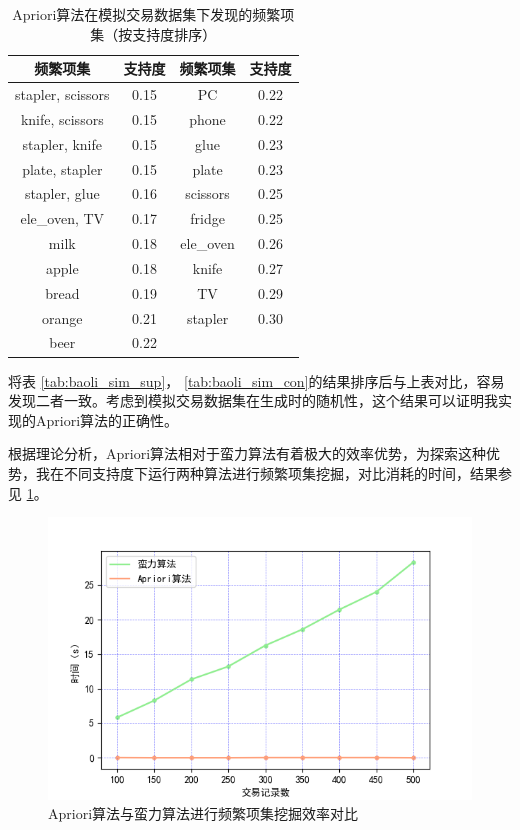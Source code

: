 \documentclass[12pt,a4paper]{article}
\theoremstyle{definition}
\begin{document}
\begin{table}[H]
	\renewcommand\arraystretch{1.35}
	\caption{Apriori算法在模拟交易数据集下发现的频繁项集（按支持度排序）}
	\label{tab:apriori_sim_sup}
	\centering
	
	\begin{tabular}{c|c|c|c}
		\centering
		频繁项集 & 支持度 & 频繁项集 & 支持度 \\
		\hline
		stapler, scissors & 0.15 & PC & 0.22 \\
		knife, scissors & 0.15 & phone & 0.22 \\
		stapler, knife & 0.15 & glue & 0.23 \\
		plate, stapler & 0.15 &plate & 0.23 \\
		stapler, glue & 0.16 & scissors & 0.25 \\
		ele\_oven, TV & 0.17 & fridge & 0.25 \\
		milk & 0.18 & ele\_oven & 0.26 \\
		apple & 0.18 & knife & 0.27 \\
		bread & 0.19 & TV & 0.29 \\
		orange & 0.21 & stapler & 0.30 \\
		beer & 0.22 & & \\		
	\end{tabular}
\end{table}

将表 \ref{tab:baoli_sim_sup}， \ref{tab:baoli_sim_con}的结果排序后与上表对比，容易发现二者一致。考虑到模拟交易数据集在生成时的随机性，这个结果可以证明我实现的Apriori算法的正确性。

根据理论分析，Apriori算法相对于蛮力算法有着极大的效率优势，为探索这种优势，我在不同支持度下运行两种算法进行频繁项集挖掘，对比消耗的时间，结果参见 \ref{fig:time_com}。

\begin{figure}[H]
	\centering
	\includegraphics[width=0.7\linewidth]{img/time_kline.png}
	\caption{Apriori算法与蛮力算法进行频繁项集挖掘效率对比}
	\label{fig:time_com}
\end{figure}
\end{document}
